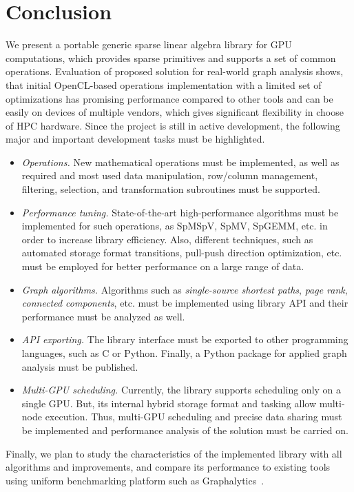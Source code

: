 \section{Conclusion}

We present a portable generic sparse linear algebra library for GPU computations, which provides sparse primitives and supports a set of common operations. Evaluation of proposed solution for real-world graph analysis shows, that initial OpenCL-based operations implementation with a limited set of optimizations has promising performance compared to other tools and can be easily on devices of multiple vendors, which gives significant flexibility in choose of HPC hardware. Since the project is still in active development, the following major and important development tasks must be highlighted.

\begin{itemize}
    \item \textit{Operations.} New mathematical operations must be implemented, as well as required and most used data manipulation, row/column management, filtering, selection, and transformation subroutines must be supported.
    
    \item \textit{Performance tuning.} State-of-the-art high-performance algorithms must be implemented for such operations, as SpMSpV, SpMV, SpGEMM, etc. in order to increase library efficiency. Also, different techniques, such as automated storage format transitions, pull-push direction optimization, etc. must be employed for better performance on a large range of data.
    
    \item \textit{Graph algorithms.} Algorithms such as \textit{single-source shortest paths}, \textit{page rank}, \textit{connected components}, etc. must be implemented using library API and their performance must be analyzed as well. 
    
    \item \textit{API exporting.} The library interface must be exported to other programming languages, such as C or Python. Finally, a Python package for applied graph analysis must be published.
    
    \item \textit{Multi-GPU scheduling.} Currently, the library supports scheduling only on a single GPU. But, its internal hybrid storage format and tasking allow multi-node execution. Thus, multi-GPU scheduling and precise data sharing must be implemented and performance analysis of the solution must be carried on.
\end{itemize}

Finally, we plan to study the characteristics of the implemented library with all algorithms and improvements, and compare its performance to existing tools using uniform benchmarking platform such as Graphalytics~\cite{Graphalytics:iosup2021ldbc}.